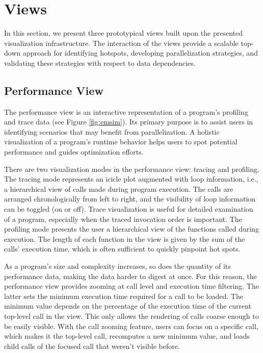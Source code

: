 \section{Views}
In this section, we present three prototypical views built upon the
presented visualization infrastructure. The interaction of the views provide a
scalable top-down approach for identifying hotspots, developing parallelization
strategies, and validating these strategies with respect to data dependencies.

\subsection{Performance View}
\label{sec:performance_view}
The performance view is an interactive representation of a program's profiling
and trace data (see Figure \ref{fig:emsim}). Its primary purpose is to assist
users in identifying scenarios that may benefit from parallelization. A
holistic visualization of a program's runtime behavior helps users to spot
potential performance and guides optimization efforts.

There are two visualization modes in the performance view: tracing and
profiling. The tracing mode represents an icicle plot augmented with loop
information, i.e., a hierarchical view of calls made during program execution.
The calls are arranged chronologically from left to right, and the visibility
of loop information can be toggled (on or off). Trace visualization is useful
for detailed examination of a program, especially when the traced invocation
order is important. The profiling mode presents the user a hierarchical view of
the functions called during execution. The length of each function in the view
is given by the sum of the calls' execution time, which is often sufficient to
quickly pinpoint hot spots.

As a program's size and complexity increases, so does the quantity of its
performance data, making the data harder to digest at once. For this reason,
the performance view provides zooming at call level and execution time
filtering. The latter sets the minimum execution time required for a call to be
loaded. The minimum value depends on the percentage of the execution time of
the current top-level call in the view. This only allows the rendering of calls
coarse enough to be easily visible. With the call zooming feature, users can
focus on a specific call, which makes it the top-level call, recomputes a new
minimum value, and loads child calls of the focused call that weren't visible
before.

